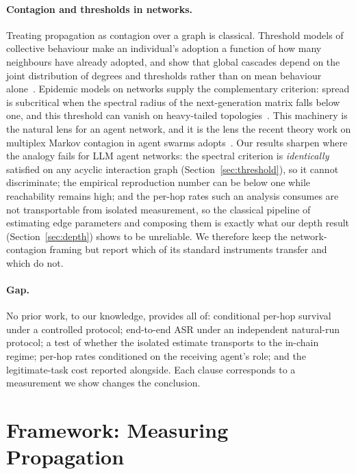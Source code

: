 \documentclass[sigconf,anonymous]{aamas}
\begin{document}
\paragraph{Contagion and thresholds in networks.}
Treating propagation as contagion over a graph is classical. Threshold models of
collective behaviour make an individual's adoption a function of how many
neighbours have already adopted, and show that global cascades depend on the joint
distribution of degrees and thresholds rather than on mean behaviour
alone~\cite{Granovetter1978,Watts2002}. Epidemic models on networks supply the
complementary criterion: spread is subcritical when the spectral radius of the
next-generation matrix falls below one, and this threshold can vanish on
heavy-tailed topologies~\cite{PastorSatorras2001}. This machinery is the natural
lens for an agent network, and it is the lens the recent theory work on multiplex
Markov contagion in agent swarms adopts~\cite{SwarmMarkov2026}. Our results
sharpen where the analogy fails for LLM agent networks: the spectral criterion is
\emph{identically} satisfied on any acyclic interaction graph
(Section~\ref{sec:threshold}), so it cannot discriminate; the empirical
reproduction number can be below one while reachability remains high; and the
per-hop rates such an analysis consumes are not transportable from isolated
measurement, so the classical pipeline of estimating edge parameters and composing
them is exactly what our depth result (Section~\ref{sec:depth}) shows to be
unreliable. We therefore keep the network-contagion framing but report which of
its standard instruments transfer and which do not.

\paragraph{Gap.} No prior work, to our knowledge, provides all of: conditional
per-hop survival under a controlled protocol; end-to-end ASR under an independent
natural-run protocol; a test of whether the isolated estimate transports to the
in-chain regime; per-hop rates conditioned on the receiving agent's role; and the
legitimate-task cost reported alongside. Each clause corresponds to a measurement we
show changes the conclusion.


\section{Framework: Measuring Propagation}
\end{document}

